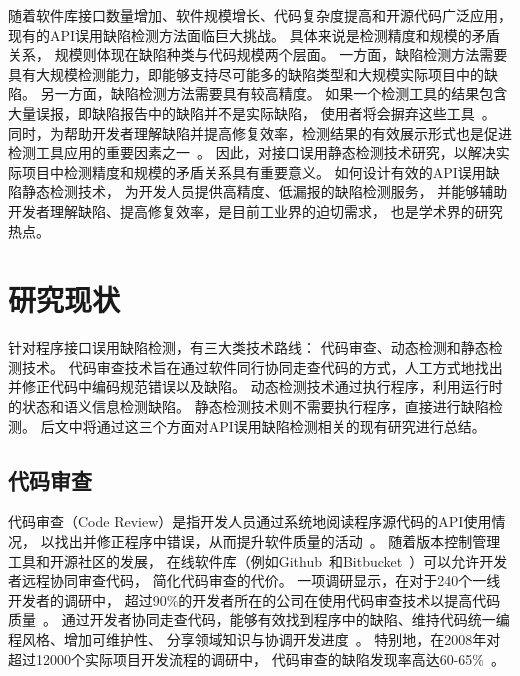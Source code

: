 随着软件库接口数量增加、软件规模增长、代码复杂度提高和开源代码广泛应用，
现有的API误用缺陷检测方法面临巨大挑战。
具体来说是检测精度和规模的矛盾关系，
规模则体现在缺陷种类与代码规模两个层面。
一方面，缺陷检测方法需要具有大规模检测能力，即能够支持尽可能多的缺陷类型和大规模实际项目中的缺陷。
另一方面，缺陷检测方法需要具有较高精度。
如果一个检测工具的结果包含大量误报，即缺陷报告中的缺陷并不是实际缺陷，
使用者将会摒弃这些工具~\cite{10-acm-precision}。
同时，为帮助开发者理解缺陷并提高修复效率，检测结果的有效展示形式也是促进检测工具应用的重要因素之一~\cite{13-icse-donotuse}。
因此，对接口误用静态检测技术研究，以解决实际项目中检测精度和规模的矛盾关系具有重要意义。
如何设计有效的API误用缺陷静态检测技术，
为开发人员提供高精度、低漏报的缺陷检测服务，
并能够辅助开发者理解缺陷、提高修复效率，是目前工业界的迫切需求，
也是学术界的研究热点。






\section{研究现状}
针对程序接口误用缺陷检测，有三大类技术路线：
代码审查、动态检测和静态检测技术。
代码审查技术旨在通过软件同行协同走查代码的方式，人工方式地找出并修正代码中编码规范错误以及缺陷。
动态检测技术通过执行程序，利用运行时的状态和语义信息检测缺陷。
静态检测技术则不需要执行程序，直接进行缺陷检测。
后文中将通过这三个方面对API误用缺陷检测相关的现有研究进行总结。

\subsection{代码审查}
代码审查（Code Review）是指开发人员通过系统地阅读程序源代码的API使用情况，
以找出并修正程序中错误，从而提升软件质量的活动~\cite{code-review}。
随着版本控制管理工具和开源社区的发展，
在线软件库（例如Github~\cite{github}和Bitbucket~\cite{bitbucket}）可以允许开发者远程协同审查代码，
简化代码审查的代价。
一项调研显示，在对于240个一线开发者的调研中，
超过90\%的开发者所在的公司在使用代码审查技术以提高代码质量~\cite{17-profes-code-review}。
通过开发者协同走查代码，能够有效找到程序中的缺陷、维持代码统一编程风格、增加可维护性、
分享领域知识与协调开发进度~\cite{13-icse-code-review}。
特别地，在2008年对超过12000个实际项目开发流程的调研中，
代码审查的缺陷发现率高达60-65\%~\cite{08-code-review}。

